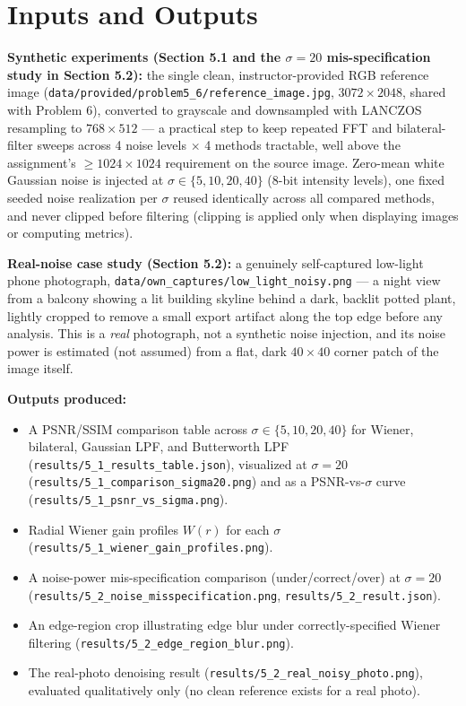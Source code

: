 \documentclass[11pt]{article}
\begin{document}
\section{Inputs and Outputs}

\textbf{Synthetic experiments (Section 5.1 and the $\sigma=20$ mis-specification study in
Section 5.2):} the single clean, instructor-provided RGB reference image
(\texttt{data/provided/problem5\_6/reference\_image.jpg}, $3072\times2048$, shared with
Problem 6), converted to grayscale and downsampled with LANCZOS resampling to $768\times512$
— a practical step to keep repeated FFT and bilateral-filter sweeps across 4 noise levels
$\times$ 4 methods tractable, well above the assignment's $\ge 1024\times1024$ requirement on
the source image. Zero-mean white Gaussian noise is injected at $\sigma\in\{5,10,20,40\}$
(8-bit intensity levels), one fixed seeded noise realization per $\sigma$ reused identically
across all compared methods, and never clipped before filtering (clipping is applied only when
displaying images or computing metrics).

\textbf{Real-noise case study (Section 5.2):} a genuinely self-captured low-light phone
photograph, \texttt{data/own\_captures/low\_light\_noisy.png} — a night view from a balcony
showing a lit building skyline behind a dark, backlit potted plant, lightly cropped to remove a
small export artifact along the top edge before any analysis. This is a \emph{real} photograph,
not a synthetic noise injection, and its noise power is estimated (not assumed) from a flat,
dark $40\times40$ corner patch of the image itself.

\textbf{Outputs produced:}
\begin{itemize}
\item A PSNR/SSIM comparison table across $\sigma\in\{5,10,20,40\}$ for Wiener, bilateral,
Gaussian LPF, and Butterworth LPF (\texttt{results/5\_1\_results\_table.json}), visualized at
$\sigma=20$ (\texttt{results/5\_1\_comparison\_sigma20.png}) and as a PSNR-vs-$\sigma$ curve
(\texttt{results/5\_1\_psnr\_vs\_sigma.png}).
\item Radial Wiener gain profiles $W(r)$ for each $\sigma$
(\texttt{results/5\_1\_wiener\_gain\_profiles.png}).
\item A noise-power mis-specification comparison (under/correct/over) at $\sigma=20$
(\texttt{results/5\_2\_noise\_misspecification.png}, \texttt{results/5\_2\_result.json}).
\item An edge-region crop illustrating edge blur under correctly-specified Wiener filtering
(\texttt{results/5\_2\_edge\_region\_blur.png}).
\item The real-photo denoising result (\texttt{results/5\_2\_real\_noisy\_photo.png}), evaluated
qualitatively only (no clean reference exists for a real photo).
\end{itemize}
\end{document}
